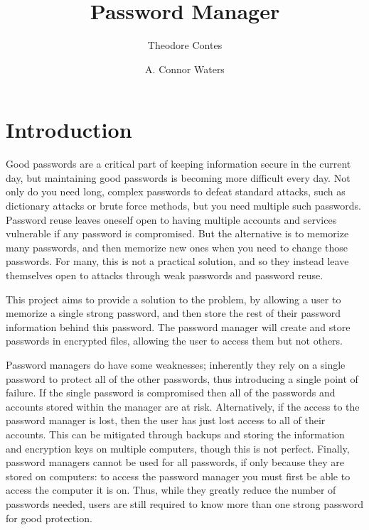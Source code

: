 \documentclass [oneside, letterpaper] {article}
\title {Password Manager}
\author {Theodore Contes \and A. Connor Waters}
\date{}
\begin{document}
    \maketitle

    \section {Introduction}
        Good passwords are a critical part of keeping information secure in the
        current day, but maintaining good passwords is becoming more difficult
        every day. Not only do you need long, complex passwords to defeat
        standard attacks, such as dictionary attacks or brute force methods, but
        you need multiple such passwords. Password reuse leaves oneself open to
        having multiple accounts and services vulnerable if any password is
        compromised. But the alternative is to memorize many passwords, and then
        memorize new ones when you need to change those passwords. For many,
        this is not a practical solution, and so they instead leave themselves
        open to attacks through weak passwords and password reuse. 

        This project aims to provide a solution to the problem, by allowing a
        user to memorize a single strong password, and then store the rest of
        their password information behind this password. The password manager
        will create and store passwords in encrypted files, allowing the user to
        access them but not others.

        Password managers do have some weaknesses; inherently they rely on a
        single password to protect all of the other passwords, thus introducing
        a single point of failure. If the single password is compromised then
        all of the passwords and accounts stored within the manager are at risk.
        Alternatively, if the access to the password manager is lost, then the
        user has just lost access to all of their accounts. This can be
        mitigated through backups and storing the information and encryption
        keys on multiple computers, though this is not perfect. Finally,
        password managers cannot be used for all passwords, if only because they
        are stored on computers: to access the password manager you must first
        be able to access the computer it is on. Thus, while they greatly reduce
        the number of passwords needed, users are still required to know more
        than one strong password for good protection.
\end{document}
